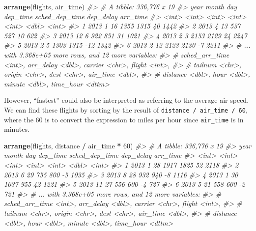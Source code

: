 \documentclass[]{book}
\newenvironment{Shaded}{\begin{snugshade}}{\end{snugshade}}
\newcommand{\CommentTok}[1]{\textcolor[rgb]{0.56,0.35,0.01}{\textit{#1}}}
\newcommand{\DecValTok}[1]{\textcolor[rgb]{0.00,0.00,0.81}{#1}}
\newcommand{\KeywordTok}[1]{\textcolor[rgb]{0.13,0.29,0.53}{\textbf{#1}}}
\newcommand{\NormalTok}[1]{#1}
\newcommand{\OperatorTok}[1]{\textcolor[rgb]{0.81,0.36,0.00}{\textbf{#1}}}
\newcommand{\StringTok}[1]{\textcolor[rgb]{0.31,0.60,0.02}{#1}}
\theoremstyle{plain}
\theoremstyle{remark}
\begin{document}
\begin{Shaded}
\begin{Highlighting}[]
\KeywordTok{arrange}\NormalTok{(flights, air_time) }
\CommentTok{#> # A tibble: 336,776 x 19}
\CommentTok{#>    year month   day dep_time sched_dep_time dep_delay arr_time}
\CommentTok{#>   <int> <int> <int>    <int>          <int>     <dbl>    <int>}
\CommentTok{#> 1  2013     1    16     1355           1315        40     1442}
\CommentTok{#> 2  2013     4    13      537            527        10      622}
\CommentTok{#> 3  2013    12     6      922            851        31     1021}
\CommentTok{#> 4  2013     2     3     2153           2129        24     2247}
\CommentTok{#> 5  2013     2     5     1303           1315       -12     1342}
\CommentTok{#> 6  2013     2    12     2123           2130        -7     2211}
\CommentTok{#> # ... with 3.368e+05 more rows, and 12 more variables:}
\CommentTok{#> #   sched_arr_time <int>, arr_delay <dbl>, carrier <chr>, flight <int>,}
\CommentTok{#> #   tailnum <chr>, origin <chr>, dest <chr>, air_time <dbl>,}
\CommentTok{#> #   distance <dbl>, hour <dbl>, minute <dbl>, time_hour <dttm>}
\end{Highlighting}
\end{Shaded}

However, ``fastest'' could also be interpreted as referring to the average air speed.
We can find these flights by sorting by the result of \texttt{distance\ /\ air\_time\ /\ 60},
where the 60 is to convert the expression to miles per hour since \texttt{air\_time} is in minutes.

\begin{Shaded}
\begin{Highlighting}[]
\KeywordTok{arrange}\NormalTok{(flights, distance }\OperatorTok{/}\StringTok{ }\NormalTok{air_time }\OperatorTok{*}\StringTok{ }\DecValTok{60}\NormalTok{)}
\CommentTok{#> # A tibble: 336,776 x 19}
\CommentTok{#>    year month   day dep_time sched_dep_time dep_delay arr_time}
\CommentTok{#>   <int> <int> <int>    <int>          <int>     <dbl>    <int>}
\CommentTok{#> 1  2013     1    28     1917           1825        52     2118}
\CommentTok{#> 2  2013     6    29      755            800        -5     1035}
\CommentTok{#> 3  2013     8    28      932            940        -8     1116}
\CommentTok{#> 4  2013     1    30     1037            955        42     1221}
\CommentTok{#> 5  2013    11    27      556            600        -4      727}
\CommentTok{#> 6  2013     5    21      558            600        -2      721}
\CommentTok{#> # ... with 3.368e+05 more rows, and 12 more variables:}
\CommentTok{#> #   sched_arr_time <int>, arr_delay <dbl>, carrier <chr>, flight <int>,}
\CommentTok{#> #   tailnum <chr>, origin <chr>, dest <chr>, air_time <dbl>,}
\CommentTok{#> #   distance <dbl>, hour <dbl>, minute <dbl>, time_hour <dttm>}
\end{Highlighting}
\end{Shaded}
\end{document}
